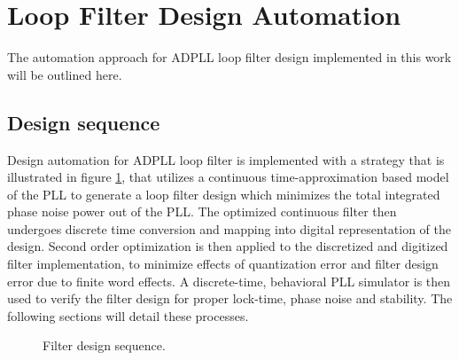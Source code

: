 


\section{Loop Filter Design Automation}\label{methods_lf_design_approach}
The automation approach for ADPLL loop filter design implemented in this work will be outlined here.

\subsection{Design sequence}
	Design automation for ADPLL loop filter is implemented with a strategy that is illustrated in figure \ref{fig:filt_design_seq}, that utilizes a continuous time-approximation based model of the PLL to generate a loop filter design which minimizes the total integrated phase noise power out of the PLL. The optimized continuous filter then undergoes discrete time conversion and mapping into digital representation of the design. Second order optimization is then applied to the discretized and digitized filter implementation, to minimize effects of quantization error and filter design error due to finite word effects. A discrete-time, behavioral PLL simulator is then used to verify the filter design for proper lock-time, phase noise and stability. The following sections will detail these processes.

	\begin{figure}[htb!]
		\center
		\caption{Filter design sequence.}
		\label{fig:filt_design_seq}
	\end{figure}
	\FloatBarrier

